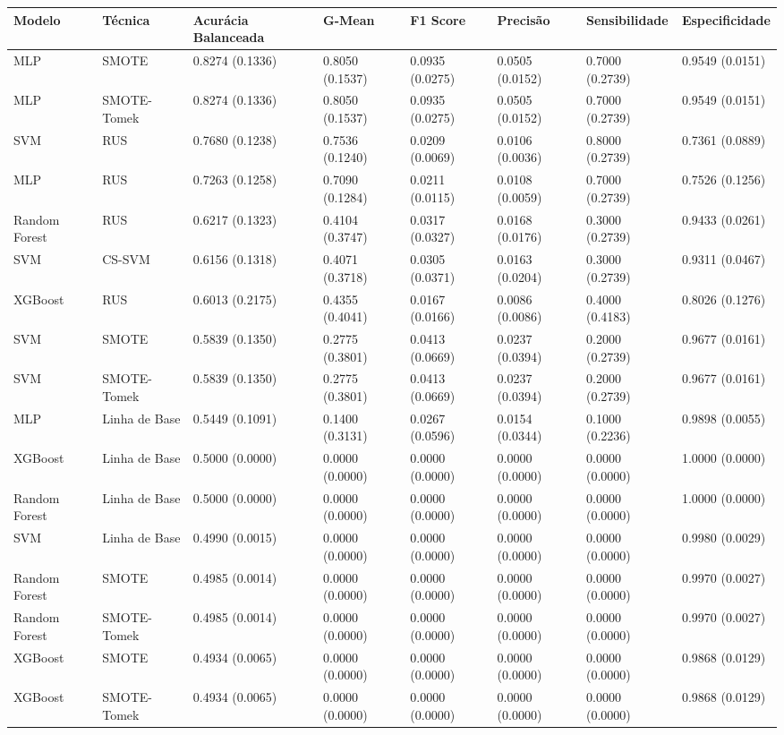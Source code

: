 \begin{tabular}{llllllll}
\toprule
Modelo & Técnica & Acurácia Balanceada & G-Mean & F1 Score & Precisão & Sensibilidade & Especificidade \\
\midrule
MLP & SMOTE & 0.8274 (0.1336) & 0.8050 (0.1537) & 0.0935 (0.0275) & 0.0505 (0.0152) & 0.7000 (0.2739) & 0.9549 (0.0151) \\
MLP & SMOTE-Tomek & 0.8274 (0.1336) & 0.8050 (0.1537) & 0.0935 (0.0275) & 0.0505 (0.0152) & 0.7000 (0.2739) & 0.9549 (0.0151) \\
SVM & RUS & 0.7680 (0.1238) & 0.7536 (0.1240) & 0.0209 (0.0069) & 0.0106 (0.0036) & 0.8000 (0.2739) & 0.7361 (0.0889) \\
MLP & RUS & 0.7263 (0.1258) & 0.7090 (0.1284) & 0.0211 (0.0115) & 0.0108 (0.0059) & 0.7000 (0.2739) & 0.7526 (0.1256) \\
Random Forest & RUS & 0.6217 (0.1323) & 0.4104 (0.3747) & 0.0317 (0.0327) & 0.0168 (0.0176) & 0.3000 (0.2739) & 0.9433 (0.0261) \\
SVM & CS-SVM & 0.6156 (0.1318) & 0.4071 (0.3718) & 0.0305 (0.0371) & 0.0163 (0.0204) & 0.3000 (0.2739) & 0.9311 (0.0467) \\
XGBoost & RUS & 0.6013 (0.2175) & 0.4355 (0.4041) & 0.0167 (0.0166) & 0.0086 (0.0086) & 0.4000 (0.4183) & 0.8026 (0.1276) \\
SVM & SMOTE & 0.5839 (0.1350) & 0.2775 (0.3801) & 0.0413 (0.0669) & 0.0237 (0.0394) & 0.2000 (0.2739) & 0.9677 (0.0161) \\
SVM & SMOTE-Tomek & 0.5839 (0.1350) & 0.2775 (0.3801) & 0.0413 (0.0669) & 0.0237 (0.0394) & 0.2000 (0.2739) & 0.9677 (0.0161) \\
MLP & Linha de Base & 0.5449 (0.1091) & 0.1400 (0.3131) & 0.0267 (0.0596) & 0.0154 (0.0344) & 0.1000 (0.2236) & 0.9898 (0.0055) \\
XGBoost & Linha de Base & 0.5000 (0.0000) & 0.0000 (0.0000) & 0.0000 (0.0000) & 0.0000 (0.0000) & 0.0000 (0.0000) & 1.0000 (0.0000) \\
Random Forest & Linha de Base & 0.5000 (0.0000) & 0.0000 (0.0000) & 0.0000 (0.0000) & 0.0000 (0.0000) & 0.0000 (0.0000) & 1.0000 (0.0000) \\
SVM & Linha de Base & 0.4990 (0.0015) & 0.0000 (0.0000) & 0.0000 (0.0000) & 0.0000 (0.0000) & 0.0000 (0.0000) & 0.9980 (0.0029) \\
Random Forest & SMOTE & 0.4985 (0.0014) & 0.0000 (0.0000) & 0.0000 (0.0000) & 0.0000 (0.0000) & 0.0000 (0.0000) & 0.9970 (0.0027) \\
Random Forest & SMOTE-Tomek & 0.4985 (0.0014) & 0.0000 (0.0000) & 0.0000 (0.0000) & 0.0000 (0.0000) & 0.0000 (0.0000) & 0.9970 (0.0027) \\
XGBoost & SMOTE & 0.4934 (0.0065) & 0.0000 (0.0000) & 0.0000 (0.0000) & 0.0000 (0.0000) & 0.0000 (0.0000) & 0.9868 (0.0129) \\
XGBoost & SMOTE-Tomek & 0.4934 (0.0065) & 0.0000 (0.0000) & 0.0000 (0.0000) & 0.0000 (0.0000) & 0.0000 (0.0000) & 0.9868 (0.0129) \\
\bottomrule
\end{tabular}
